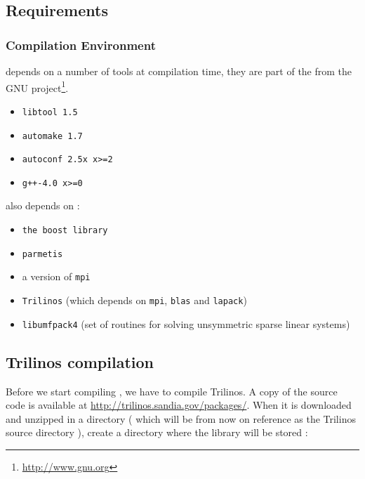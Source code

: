 \subsection{Requirements}

\subsubsection{Compilation Environment}
\label{sec:comp-envir}

\lifev depends on a number of tools at compilation time, they are part
of the  from the GNU project\footnote{\url{http://www.gnu.org}}.

\begin{itemize}
\item \verb!libtool 1.5!
\item \verb!automake 1.7!
\item \verb!autoconf 2.5x x>=2!
\item \verb!g++-4.0 x>=0!
\end{itemize}

\lifev also depends on :

\begin{itemize}
\item \verb!the boost library!
\item \verb!parmetis!
\item a version of \verb!mpi!
\item \verb!Trilinos! (which depends on \verb!mpi!, \verb!blas! and \verb!lapack!)
\item \verb!libumfpack4! (set of routines for solving unsymmetric sparse linear systems)
\end{itemize}



\subsection{Trilinos compilation}
Before we start compiling \lifev, we have to compile Trilinos. A copy of the source
code is available at \url{http://trilinos.sandia.gov/packages/}. When it is
downloaded and unzipped in a directory ( which will be from now on reference as the Trilinos
source directory ), create a directory where the library will be stored :

